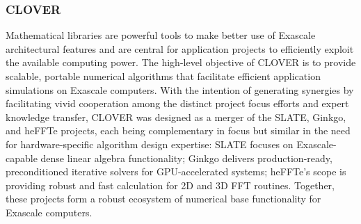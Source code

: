 \subsubsection{ CLOVER} 
Mathematical libraries are powerful tools to make better use of Exascale 
architectural features and are central for application projects to efficiently 
exploit the available computing power. The high-level objective of CLOVER is to 
provide scalable, portable numerical algorithms that facilitate efficient 
application simulations on Exascale computers. With the intention of generating synergies 
by facilitating vivid cooperation among the distinct project focus efforts 
and expert knowledge transfer, CLOVER was designed as a merger of the SLATE, 
Ginkgo, and heFFTe projects, each being complementary 
in focus but similar in the need for hardware-specific algorithm design 
expertise: SLATE focuses on Exascale-capable dense linear algebra 
functionality; Ginkgo delivers production-ready, preconditioned iterative solvers for 
GPU-accelerated systems;
heFFTe’s scope is providing robust and fast calculation for 2D 
and 3D FFT routines. Together, these projects form a robust ecosystem of numerical 
base functionality for Exascale computers.
\newpage
